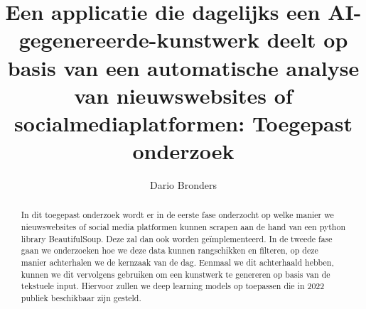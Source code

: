\documentclass{hogent-article}
\title{Een applicatie die dagelijks een AI-gegenereerde-kunstwerk deelt op basis van een automatische analyse van nieuwswebsites of socialmediaplatformen: Toegepast onderzoek}
\author{Dario Bronders}
\begin{document}
\begin{abstract}
    In dit toegepast onderzoek wordt er in de eerste fase onderzocht  op welke manier we nieuwswebsites of social media platformen kunnen scrapen aan de hand van een python library BeautifulSoup. Deze zal dan ook worden geïmplementeerd. In de tweede fase gaan we onderzoeken hoe we deze data kunnen rangschikken en filteren, op deze manier achterhalen we de kernzaak van de dag. Eenmaal we dit achterhaald hebben, kunnen we dit vervolgens gebruiken om een kunstwerk te genereren op basis van de tekstuele input. Hiervoor zullen we deep learning models op toepassen die in 2022 publiek beschikbaar zijn gesteld. 
\end{abstract}

\tableofcontents



\printbibliography[heading=bibintoc]
\end{document}
